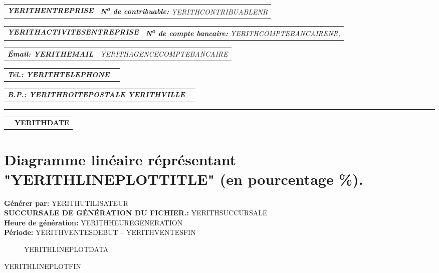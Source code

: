 \documentclass[11pt,a4paper]{article} %
\makeatletter
\newcommand{\headerrow}[2]
{\begin{tabular*}{\linewidth}{l@{\extracolsep{\fill}}r}
#1 &
#2 \\
\end{tabular*}}
\newcommand{\emphbold}[1]{\textbf{\emph{#1}}\xspace}
\makeatother
\begin{document}
\bigskip

\headerrow
	{\emphbold{YERITHENTREPRISE}}
	{\emph{\textbf{N\textsuperscript{o} de contribuable:} YERITHCONTRIBUABLENR}}
\headerrow
	{\emphbold{YERITHACTIVITESENTREPRISE}}
	{\emph{\textbf{N\textsuperscript{o} de compte bancaire:} YERITHCOMPTEBANCAIRENR,}}
\headerrow
	{\emphbold{\'Email: YERITHEMAIL}}
	{\emph{YERITHAGENCECOMPTEBANCAIRE}}
\headerrow
	{\emphbold{T\'el.: YERITHTELEPHONE}}
	{}
\headerrow
	{\emphbold{B.P.: YERITHBOITEPOSTALE YERITHVILLE}}
	{}

\hrule

\headerrow
	{}
	{\textbf{YERITHDATE}}


\section*{Diagramme linéaire r\'epr\'esentant "YERITHLINEPLOTTITLE" (en pourcentage \%).}
\textbf{G\'en\'erer par:} YERITHUTILISATEUR\\
\textbf{SUCCURSALE DE GÉNÉRATION DU FICHIER.:} YERITHSUCCURSALE\\
\textbf{Heure de g\'en\'eration:} YERITHHEUREGENERATION\\
\textbf{P\'eriode:} YERITHVENTESDEBUT -- YERITHVENTESFIN


\begin{figure}[!htbp]
\setlength{\DTLbaroutlinewidth}{1pt}
\centering
YERITHLINEPLOTDATA
\end{figure}


YERITHLINEPLOTFIN
\end{document}
